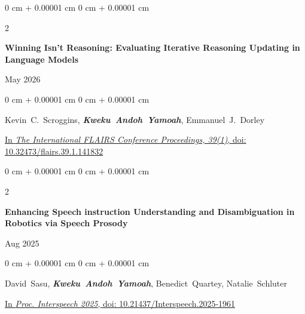 \documentclass[10pt, letterpaper]{article}
\newenvironment{onecolentry}{
    \begin{adjustwidth}{
        0 cm + 0.00001 cm
    }{
        0 cm + 0.00001 cm
    }
}{
    \end{adjustwidth}
} %
\newenvironment{twocolentry}[2][]{
    \onecolentry
    \def\secondColumn{#2}
    \setcolumnwidth{\fill, 4.5 cm}
    \begin{paracol}{2}
}{
    \switchcolumn \raggedleft \secondColumn
    \end{paracol}
    \endonecolentry
} %
\begin{document}
        \vspace{0.20 cm}
        \begin{samepage}
            \begin{twocolentry}{
                May 2026
            }
                \textbf{Winning Isn’t Reasoning: Evaluating Iterative Reasoning Updating in Language Models}
            \end{twocolentry}
            \vspace{0.10 cm}

            \begin{onecolentry}
                \mbox{Kevin C. Scroggins}, \mbox{\textbf{\textit{Kweku Andoh Yamoah}}}, \mbox{Emmanuel J. Dorley}
                \vspace{0.10 cm}

                \href{https://journals.flvc.org/FLAIRS/article/view/141832/147189}{In \textit{The International FLAIRS Conference Proceedings, 39(1)}, doi: 10.32473/flairs.39.1.141832}
                \end{onecolentry}
        \end{samepage}

        \vspace{0.20 cm}
        \begin{samepage}
            \begin{twocolentry}{
                Aug 2025
            }
                \textbf{Enhancing Speech instruction Understanding and Disambiguation in Robotics via Speech Prosody}
            \end{twocolentry}
            \vspace{0.10 cm}

            \begin{onecolentry}
                \mbox{David Sasu}, \mbox{\textbf{\textit{Kweku Andoh Yamoah}}}, \mbox{Benedict Quartey}, \mbox{Natalie Schluter}
                \vspace{0.10 cm}

                \href{https://www.isca-archive.org/interspeech_2025/sasu25b_interspeech.pdf}{In \textit{Proc. Interspeech 2025}, doi: 10.21437/Interspeech.2025-1961}
                \end{onecolentry}
        \end{samepage}
\end{document}
